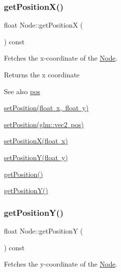 \subsubsection{\texorpdfstring{getPositionX()}{getPositionX()}}
{\footnotesize\ttfamily float Node\+::get\+PositionX (\begin{DoxyParamCaption}{ }\end{DoxyParamCaption}) const}



Fetches the x-\/coordinate of the \mbox{\hyperlink{classsage_1_1Node}{Node}}. 

\begin{DoxyReturn}{Returns}
the x coordinate 
\end{DoxyReturn}
\begin{DoxySeeAlso}{See also}
\mbox{\hyperlink{classsage_1_1Node_a7e0ae6eeb84fae60e54e6685c982b0b2}{pos}} 

\mbox{\hyperlink{classsage_1_1Node_aaa8545c103ef1b35e5076dbedab93af5}{set\+Position(float x, float y)}} 

\mbox{\hyperlink{classsage_1_1Node_ae2731cefe38e706c2bf21afae6da18b3}{set\+Position(glm\+::vec2 pos)}} 

\mbox{\hyperlink{classsage_1_1Node_ae1dfc73d6122a95778d5d9db3d1fd913}{set\+Position\+X(float x)}} 

\mbox{\hyperlink{classsage_1_1Node_a5c97d36655f0daa71a5f6c715d2b0470}{set\+Position\+Y(float y)}} 

\mbox{\hyperlink{classsage_1_1Node_a67eb5862f4da3cc4b2219a7e555a5678}{get\+Position()}} 

\mbox{\hyperlink{classsage_1_1Node_a26337a40b7da400233451b71e85759cc}{get\+Position\+Y()}} 
\end{DoxySeeAlso}
\mbox{\label{classsage_1_1Node_a26337a40b7da400233451b71e85759cc}} 
\subsubsection{\texorpdfstring{getPositionY()}{getPositionY()}}
{\footnotesize\ttfamily float Node\+::get\+PositionY (\begin{DoxyParamCaption}{ }\end{DoxyParamCaption}) const}



Fetches the y-\/coordinate of the \mbox{\hyperlink{classsage_1_1Node}{Node}}. 

